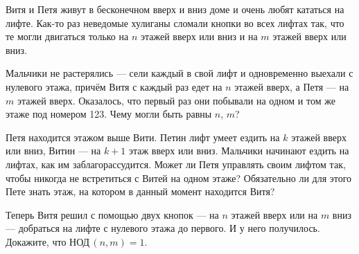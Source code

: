 ﻿

\noindent Витя и Петя живут в бесконечном вверх и вниз доме и очень любят кататься на лифте. Как-то раз неведомые хулиганы сломали кнопки во всех лифтах так, что те могли двигаться только на $n$ этажей вверх или вниз и на $m$ этажей вверх или вниз. 
\begin{itemize}

\itA Мальчики не растерялись — сели каждый в свой лифт и одновременно выехали с нулевого этажа, причём Витя с каждый раз едет на $n$ этажей вверх, а Петя — на $m$ этажей вверх. Оказалось, что первый раз они побывали на одном и том же этаже под номером 123. Чему могли быть равны $n$, $m$?

\itB Петя находится этажом выше Вити. Петин лифт умеет ездить на $k$ этажей вверх или вниз, Витин — на $k+1$ этаж вверх или вниз. Мальчики начинают ездить на лифтах, как им заблагорассудится. Может ли Петя управлять своим лифтом так, чтобы никогда не встретиться с Витей на одном этаже? Обязательно ли для этого Пете знать этаж, на котором в данный момент находится Витя?

\itC Теперь Витя решил с помощью двух кнопок — на $n$ этажей вверх или на $m$ вниз — добраться на лифте с нулевого этажа до первого. И у него получилось. Докажите, что НОД\,$(n,m)=1$.
\end{itemize}